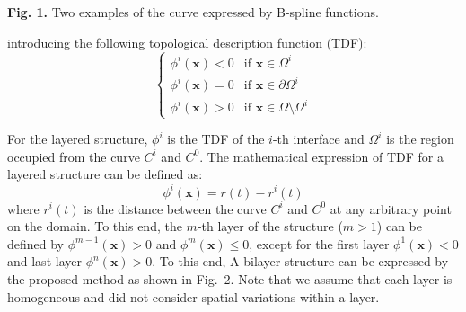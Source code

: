 \documentclass[11pt]{article}
\begin{document}
\vspace{1em}
\begin{center}
\end{center}
\vspace{0.4em}
\begin{center}
\textbf{Fig. 1.} Two examples of the curve expressed by B-spline functions.
\end{center}

\newpage

\setcounter{equation}{7}

\noindent
introducing the following topological description function (TDF):
\begin{equation}
\begin{cases}
\phi^i(\mathbf{x}) < 0 & \text{if } \mathbf{x} \in \Omega^i \\
\phi^i(\mathbf{x}) = 0 & \text{if } \mathbf{x} \in \partial\Omega^i \\
\phi^i(\mathbf{x}) > 0 & \text{if } \mathbf{x} \in \Omega \setminus \Omega^i
\end{cases}
\end{equation}

For the layered structure, $\phi^i$ is the TDF of the $i$-th
interface and $\Omega^i$ is the region occupied from the curve $C^i$
and $C^0$. The mathematical expression of TDF for a layered structure
can be defined as:
\begin{equation}
\phi^i(\mathbf{x}) = r(t) - r^i(t)
\end{equation}
where $r^i(t)$ is the distance between the curve $C^i$ and $C^0$ at
any arbitrary point on the domain. To this end, the $m$-th layer of
the structure ($m > 1$) can be defined by $\phi^{m-1}(\mathbf{x}) > 0$
and $\phi^{m}(\mathbf{x}) \leq 0$, except for the first layer
$\phi^{1}(\mathbf{x}) < 0$ and last layer $\phi^{n}(\mathbf{x}) > 0$.
To this end, A bilayer structure can be expressed by the proposed
method as shown in Fig.~2. Note that we assume that each layer is
homogeneous and did not consider spatial variations within a layer.
\end{document}
